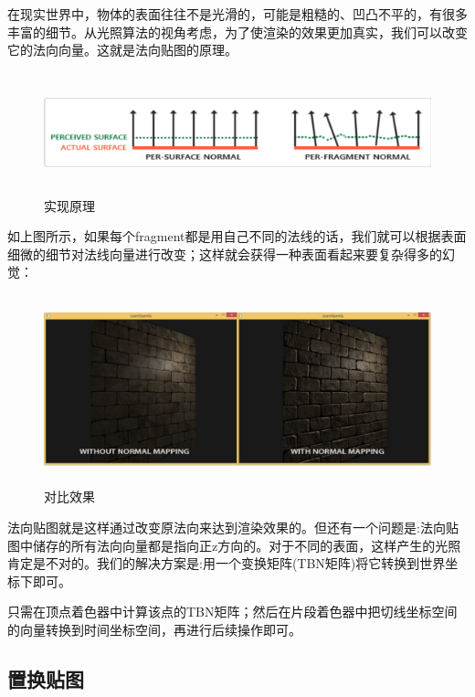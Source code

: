 \documentclass{article}
\begin{document}
	在现实世界中，物体的表面往往不是光滑的，可能是粗糙的、凹凸不平的，有很多丰富的细节。从光照算法的视角考虑，为了使渲染的效果更加真实，我们可以改变它的法向向量。这就是法向贴图的原理。
		\begin{figure}[H]
		\begin{center}
			
			\includegraphics[width=15cm,height=3.5cm]{yuanli}
			
		 \caption{实现原理}	\label{jiemian.label}
		\end{center}
	\end{figure}
   如上图所示，如果每个fragment都是用自己不同的法线的话，我们就可以根据表面细微的细节对法线向量进行改变；这样就会获得一种表面看起来要复杂得多的幻觉：
   		\begin{figure}[H]
   	\begin{center}
   		
   		\includegraphics[width=15cm,height=5.5cm]{duibi}
   		
   		\caption{对比效果}	\label{duibi.label}
   	\end{center}
   \end{figure}

  法向贴图就是这样通过改变原法向来达到渲染效果的。但还有一个问题是:法向贴图中储存的所有法向向量都是指向正z方向的。对于不同的表面，这样产生的光照肯定是不对的。我们的解决方案是:用一个变换矩阵(TBN矩阵)将它转换到世界坐标下即可。
  
  只需在顶点着色器中计算该点的TBN矩阵；然后在片段着色器中把切线坐标空间的向量转换到时间坐标空间，再进行后续操作即可。
	
	\subsection{置换贴图}
	
\end{document}
